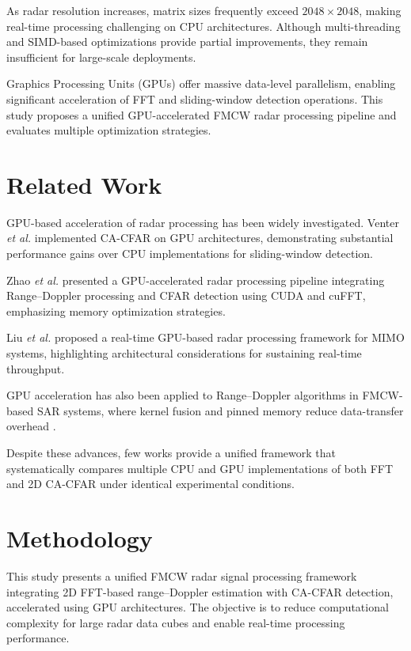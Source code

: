 \documentclass[conference, a4paper]{IEEEtran}
\begin{document}
As radar resolution increases, matrix sizes frequently exceed $2048 \times 2048$, making real-time processing challenging on CPU architectures. Although multi-threading and SIMD-based optimizations provide partial improvements, they remain insufficient for large-scale deployments. 

Graphics Processing Units (GPUs) offer massive data-level parallelism, enabling significant acceleration of FFT and sliding-window detection operations. This study proposes a unified GPU-accelerated FMCW radar processing pipeline and evaluates multiple optimization strategies.

\section{Related Work}

GPU-based acceleration of radar processing has been widely investigated. 
Venter \textit{et al.} \cite{venter2011} implemented CA-CFAR on GPU architectures, demonstrating substantial performance gains over CPU implementations for sliding-window detection.

Zhao \textit{et al.} \cite{zhao2023} presented a GPU-accelerated radar processing pipeline integrating Range–Doppler processing and CFAR detection using CUDA and cuFFT, emphasizing memory optimization strategies.

Liu \textit{et al.} \cite{liu2023} proposed a real-time GPU-based radar processing framework for MIMO systems, highlighting architectural considerations for sustaining real-time throughput.

GPU acceleration has also been applied to Range–Doppler algorithms in FMCW-based SAR systems, where kernel fusion and pinned memory reduce data-transfer overhead \cite{jung2023}.

Despite these advances, few works provide a unified framework that systematically compares multiple CPU and GPU implementations of both FFT and 2D CA-CFAR under identical experimental conditions.

\section{Methodology}

This study presents a unified FMCW radar signal processing framework integrating 2D FFT-based range–Doppler estimation with CA-CFAR detection, accelerated using GPU architectures. The objective is to reduce computational complexity for large radar data cubes and enable real-time processing performance.
\end{document}
